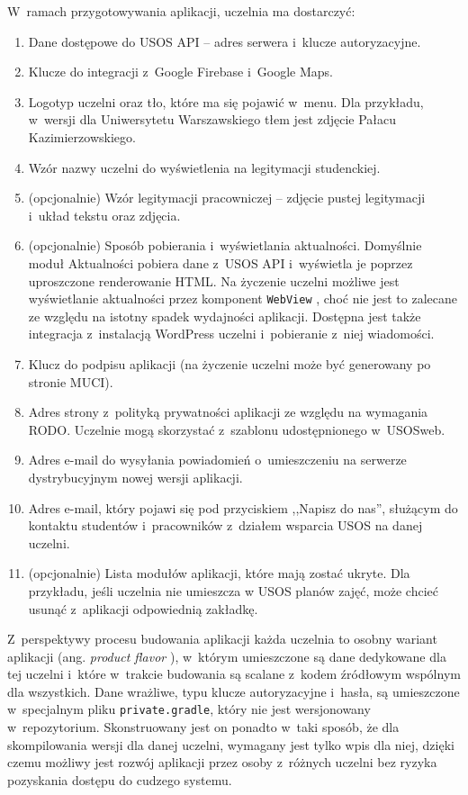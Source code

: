 \documentclass{pracamgr}
\begin{document}
W~ramach przygotowywania aplikacji, uczelnia ma dostarczyć:
\begin{enumerate}
	\item Dane dostępowe do USOS API -- adres serwera i~klucze autoryzacyjne.
	\item Klucze do integracji z~Google Firebase i~Google Maps.
	\item Logotyp uczelni oraz tło, które ma się pojawić w~menu. Dla przykładu, w~wersji dla Uniwersytetu Warszawskiego
        tłem jest zdjęcie Pałacu Kazimierzowskiego.
	\item Wzór nazwy uczelni do wyświetlenia na legitymacji studenckiej.
	\item (opcjonalnie) Wzór legitymacji pracowniczej -- zdjęcie pustej legitymacji i~układ tekstu oraz zdjęcia.
	\item (opcjonalnie) Sposób pobierania i~wyświetlania aktualności. Domyślnie moduł Aktualności pobiera dane z~USOS
        API i~wyświetla je poprzez uproszczone renderowanie HTML. Na życzenie uczelni możliwe jest wyświetlanie
        aktualności przez komponent \texttt{WebView} \cite{webview}, choć nie jest to zalecane ze względu na istotny
        spadek wydajności aplikacji. Dostępna jest także integracja z~instalacją WordPress uczelni i~pobieranie z~niej wiadomości.
	\item Klucz do podpisu aplikacji (na życzenie uczelni może być generowany po stronie MUCI).
	\item Adres strony z~polityką prywatności aplikacji ze względu na wymagania RODO. Uczelnie mogą skorzystać z~szablonu udostępnionego w~USOSweb.
	\item Adres e-mail do wysyłania powiadomień o~umieszczeniu na serwerze dystrybucyjnym nowej wersji aplikacji.
	\item Adres e-mail, który pojawi się pod przyciskiem ,,Napisz do nas'', służącym do kontaktu studentów i~pracowników z~działem wsparcia USOS na danej uczelni.
	\item (opcjonalnie) Lista modułów aplikacji, które mają zostać ukryte. Dla przykładu, jeśli
	uczelnia nie umieszcza w USOS planów zajęć, może chcieć usunąć z~aplikacji odpowiednią
	zakładkę.
\end{enumerate}

Z~perspektywy procesu budowania aplikacji każda uczelnia to osobny wariant aplikacji 
(ang. \textit{product flavor} \cite{product-flavor}), w~którym umieszczone są dane dedykowane dla tej uczelni i~które w~trakcie
budowania są scalane z~kodem źródłowym wspólnym dla wszystkich. Dane wrażliwe, typu klucze autoryzacyjne i~hasła, są
umieszczone w~specjalnym pliku \texttt{private.gradle}, który nie jest wersjonowany w~repozytorium. Skonstruowany jest on
ponadto w~taki sposób, że dla skompilowania wersji dla danej uczelni, wymagany jest tylko wpis dla niej, dzięki czemu
możliwy jest rozwój aplikacji przez osoby z~różnych uczelni bez ryzyka pozyskania dostępu do cudzego systemu.
\end{document}
